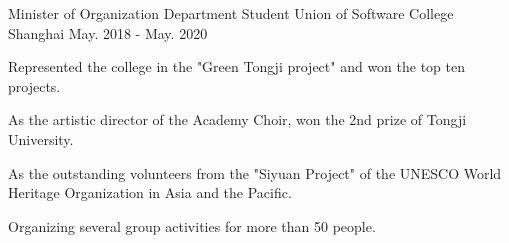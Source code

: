 
\begin{cventries}
  \cventry
    {Minister of Organization Department} %
    {Student Union of Software College} %
    {Shanghai} %
    {May. 2018 - May. 2020} %
    {
      \begin{cvitems} %
        \item {Represented the college in the "Green Tongji project" and won the top ten projects.}
		\item {As the artistic director of the Academy Choir, won the 2nd prize of Tongji University.}
		\item {As the outstanding volunteers from the "Siyuan Project" of the UNESCO World Heritage Organization in Asia and the Pacific.}
		\item {Organizing several group activities for more than 50 people.}
      \end{cvitems}
    }

\end{cventries}